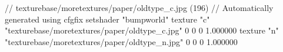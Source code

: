 // texturebase/moretextures/paper/oldtype_c.jpg (196)
// Automatically generated using cfgfix
setshader "bumpworld"
texture "c" "texturebase/moretextures/paper/oldtype_c.jpg" 0 0 0 1.000000
texture "n" "texturebase/moretextures/paper/oldtype_n.jpg" 0 0 0 1.000000
